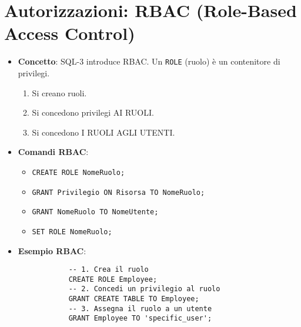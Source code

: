 \documentclass{article}
\begin{document}
	\section{Autorizzazioni: RBAC (Role-Based Access Control)}
	\begin{itemize}
		\item \textbf{Concetto}: SQL-3 introduce RBAC. Un \texttt{ROLE} (ruolo) è un contenitore di privilegi.
		\begin{enumerate}
			\item Si creano ruoli.
			\item Si concedono privilegi AI RUOLI.
			\item Si concedono I RUOLI AGLI UTENTI.
		\end{enumerate}
		\item \textbf{Comandi RBAC}:
		\begin{itemize}
			\item \texttt{CREATE ROLE NomeRuolo;}
			\item \texttt{GRANT Privilegio ON Risorsa TO NomeRuolo;}
			\item \texttt{GRANT NomeRuolo TO NomeUtente;}
			\item \texttt{SET ROLE NomeRuolo;}
		\end{itemize}
		\item \textbf{Esempio RBAC}:
		\begin{verbatim}
			-- 1. Crea il ruolo
			CREATE ROLE Employee;
			-- 2. Concedi un privilegio al ruolo
			GRANT CREATE TABLE TO Employee;
			-- 3. Assegna il ruolo a un utente
			GRANT Employee TO 'specific_user';
		\end{verbatim}
	\end{itemize}
	
\end{document}
